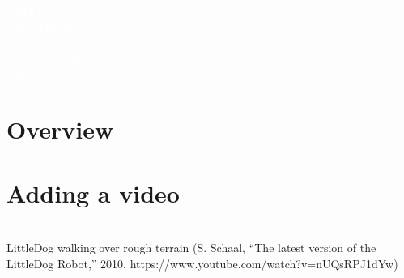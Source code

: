 \documentclass[%
    fourtothree=true, %
    DepLogo=true     %
    ]{ETHpres}
\newcommand*{\ETHtitle}{TITLE}
\newcommand*{\ETHauthor}{AUTHOR}
\begin{document}
\ETHtitelbild\textcolor{white}{\large\textbf{\ETHtitle}}\\~\newline\hspace{6mm}\normalsize%
\textcolor{white}{
\textbf{\ETHauthor}\\ \\
TYPE OF PROJECT\\
Supervised by }\\

\clearpage

\ETHslide
\section*{Overview}
\tableofcontents

\clearpage

\ETHslide
\section*{Adding a video}
\\
		\footnotesize{LittleDog walking over rough terrain (S. Schaal, ``The latest version of the LittleDog Robot,'' 2010. https://www.youtube.com/watch?v=nUQsRPJ1dYw)}
			
\clearpage


\ETHslide
\end{document}
